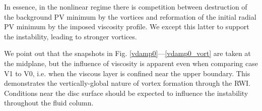 In essence, in the nonlinear regime there is competition
between destruction of the background PV minimum by the
vortices and reformation of the initial radial PV minimum by the
imposed viscosity profile. We except this latter to support the
instability, leading to stronger vortices.  

 
We point out that the snapshots in
Fig. \ref{vdamp0}---\ref{vdamp0_vort} are taken at the midplane, but  
the influence of viscosity is apparent even when comparing case V1 to
V0, i.e. when the viscous layer is confined near the upper
boundary. This demonstrates the vertically-global nature of vortex
formation through the RWI. Conditions near the disc
surface should be expected to influence the instability throughout the
fluid column. 



